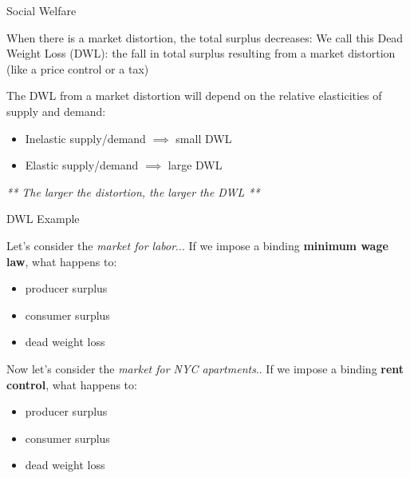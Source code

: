 \documentclass[compress]{beamer}
\begin{document}
\begin{frame}{Social Welfare}
    \begin{block}{When there is a market distortion, the total surplus decreases:}
        We call this Dead Weight Loss (DWL): the fall in total surplus resulting from a market distortion (like a price control or a tax)
    \end{block}

    \begin{block}{The DWL from a market distortion will depend on the relative elasticities of supply and demand:}
        \begin{itemize}
            \item Inelastic supply/demand $\implies$ small DWL
            \item Elastic supply/demand $\implies$ large DWL
        \end{itemize}
    \end{block}
    \begin{center}
\textit{       ** The larger the distortion, the larger the DWL **
}    \end{center}
\end{frame}

\begin{frame}{DWL Example}
    \begin{block}{Let's consider the \textit{market for labor}...}
    If we impose a binding \textbf{minimum wage law}, what happens to:
    \begin{itemize}
        \item producer surplus
        \item consumer surplus
        \item dead weight loss
    \end{itemize}
    \end{block}

    \begin{block}{Now let's consider the \textit{market for NYC apartments}..}
    If we impose a binding \textbf{rent control}, what happens to:
    \begin{itemize}
        \item producer surplus
        \item consumer surplus
        \item dead weight loss
    \end{itemize}
    \end{block}
\end{frame}
\end{document}
